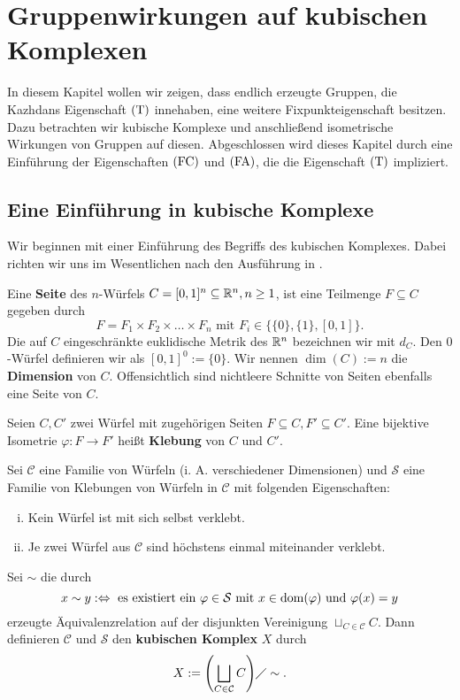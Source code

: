 \chapter{Gruppenwirkungen auf kubischen Komplexen}
\label{cha:wirkungen_kubische_komplexe}
	In diesem Kapitel wollen wir zeigen, dass endlich erzeugte Gruppen, die Kazhdans Eigenschaft $\operatorname{(T)}$ innehaben, eine weitere Fixpunkteigenschaft besitzen. Dazu betrachten wir kubische Komplexe und anschließend isometrische Wirkungen von Gruppen auf diesen. Abgeschlossen wird dieses Kapitel durch eine Einführung der Eigenschaften $\operatorname{(FC)}$ und $\operatorname{(FA)}$, die die Eigenschaft $\operatorname{(T)}$ impliziert.
	
\section{Eine Einführung in kubische Komplexe}
\label{sec:kub_kpx}
	Wir beginnen mit einer Einführung des Begriffs des kubischen Komplexes. Dabei richten wir uns im Wesentlichen nach den Ausführung in \cite[S. 7\psqq]{Schwer}.

\begin{definition}
	Eine \textbf{Seite} des $n$-Würfels $C=[0,1]^n \subseteq \mathbb{R}^n, n \geq 1$, ist eine Teilmenge $F \subseteq C$ gegeben durch
	\[ F = F_1 \times F_2 \times \dots \times F_n \text{ mit } F_i \in \{ \{0\}, \{1\}, [0,1]\}.\]
	Die auf $C$ eingeschränkte euklidische Metrik des $\mathbb{R}^n$ bezeichnen wir mit $d_C$. Den $0$-Würfel definieren wir als $[0,1]^0 := \{0\}$. Wir nennen $\dim(C) := n$ die \textbf{Dimension} von $C$. Offensichtlich sind nichtleere Schnitte von Seiten ebenfalls eine Seite von $C$.
\end{definition}

\begin{definition}
	Seien $C, C'$ zwei Würfel mit zugehörigen Seiten $F \subseteq C, F' \subseteq C'$. Eine bijektive Isometrie $\varphi\colon F \rightarrow F'$ heißt \textbf{Klebung} von $C$ und $C'$.
	
	Sei $\mathcal{C}$ eine Familie von Würfeln (i. A. verschiedener Dimensionen) und $\mathcal{S}$ eine Familie von Klebungen von Würfeln in $\mathcal{C}$ mit folgenden Eigenschaften:
	\begin{enumerate}[(i)]
		\item Kein Würfel ist mit sich selbst verklebt.
		\item Je zwei Würfel aus $\mathcal{C}$ sind höchstens einmal miteinander verklebt.
	\end{enumerate}
	
	Sei $\sim$ die durch
	\[ x \sim y :\Leftrightarrow \text{ es existiert ein } \varphi \in \mathcal{S} \text{ mit } x \in \operatorname{dom}(\varphi) \text{ und } \varphi(x) = y \]
	erzeugte Äquivalenzrelation	auf der disjunkten Vereinigung $\sqcup_{C \in \mathcal{C}} C$. Dann definieren $\mathcal{C}$ und $\mathcal{S}$ den \textbf{kubischen Komplex} $X$ durch
	\[ X := \enbrace*{\bigsqcup_{C \in \mathcal{C}} C} \diagup \sim. \]	
\end{definition}

